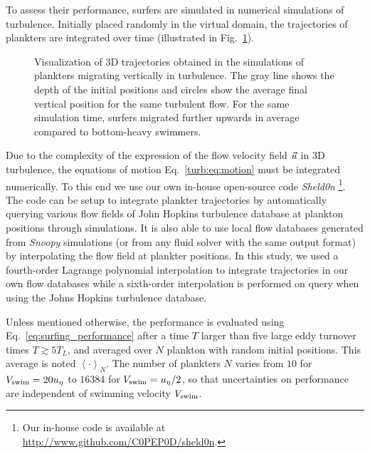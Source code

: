 To assess their performance, surfers are simulated in numerical simulations of turbulence.
Initially placed randomly in the virtual domain, the trajectories of plankters are integrated over time (illustrated in Fig.~\ref{fig:turbulence_trajectories}).
\begin{figure}[t]
	\centering
	\def\svgwidth{0.65\textwidth}
	
	\caption[Visualization of 3D trajectories obtained in the simulations of plankters migrating vertically in turbulence.]{
  		Visualization of 3D trajectories obtained in the simulations of plankters migrating vertically in turbulence.
  		The gray line shows the depth of the initial positions and circles show the average final vertical position for the same turbulent flow.
  		For the same simulation time, surfers migrated further upwards in average compared to bottom-heavy swimmers.
  	}
	\label{fig:turbulence_trajectories}
\end{figure}
Due to the complexity of the expression of the flow velocity field $\vec{u}$ in 3D turbulence, the equations of motion Eq.~\eqref{turb:eq:motion} must be integrated numerically. 
To this end we use our own in-house open-source code \textit{Sheld0n} \footnote{Our in-house code is available at \url{http://www.github.com/C0PEP0D/sheld0n}.}.
The code can be setup to integrate plankter trajectories by automatically querying various flow fields of John Hopkins turbulence database at plankton positions through simulations.
It is also able to use local flow databases generated from \textit{Snoopy} simulations (or from any fluid solver with the same output format) by interpolating the flow field at plankter positions.
In this study, we used a fourth-order Lagrange polynomial interpolation to integrate trajectories in our own flow databases while a sixth-order interpolation is performed on query when using the Johns Hopkins turbulence database.

Unless mentioned otherwise, the performance is evaluated using Eq.~\eqref{eq:surfing_performance} after a time $T$ larger than five large eddy turnover times $T \gtrsim 5 T_L$, and averaged over $N$ plankton with random initial positions.
This average is noted $\left\langle \cdot \right\rangle_N$.
The number of plankters $N$ varies from $10$ for $V_{\mathrm{swim}} = 20 u_{\eta}$ to $16384$ for $V_{\mathrm{swim}} = u_{\eta}/2$, so that uncertainties on performance are independent of swimming velocity $V_{\mathrm{swim}}$.


